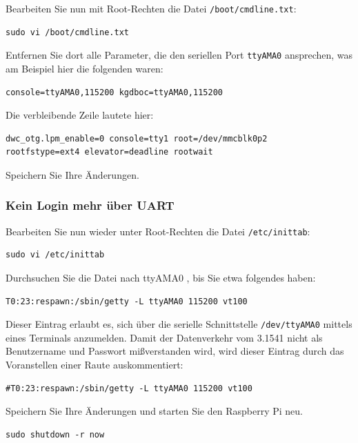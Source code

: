 \documentclass[10pt,a4paper]{scrartcl}		%
\begin{document}
Bearbeiten Sie nun mit Root-Rechten die Datei \texttt{/boot/cmdline.txt}:

\begin{verbatim}
sudo vi /boot/cmdline.txt
\end{verbatim}

Entfernen Sie dort alle Parameter, die den seriellen Port \texttt{ttyAMA0}
ansprechen, was am Beispiel hier die folgenden waren:

\begin{verbatim}
console=ttyAMA0,115200 kgdboc=ttyAMA0,115200
\end{verbatim}

Die verbleibende Zeile lautete hier:
\begin{verbatim}
dwc_otg.lpm_enable=0 console=tty1 root=/dev/mmcblk0p2 
rootfstype=ext4 elevator=deadline rootwait
\end{verbatim}

Speichern Sie Ihre Änderungen.

\subsubsection*{Kein Login mehr über UART}
Bearbeiten Sie nun wieder unter
Root-Rechten die Datei \texttt{/etc/inittab}:

\begin{verbatim}
sudo vi /etc/inittab
\end{verbatim}

Durchsuchen Sie die Datei nach \glqq{}ttyAMA0 \grqq{}, bis Sie 
etwa folgendes haben:

\begin{verbatim}
T0:23:respawn:/sbin/getty -L ttyAMA0 115200 vt100
\end{verbatim}

Dieser Eintrag erlaubt es, sich über die serielle Schnittstelle
\texttt{/dev/ttyAMA0} mittels eines Terminals anzumelden.
Damit der Datenverkehr vom 3.1541 nicht als Benutzername und Passwort
mißverstanden wird, wird dieser Eintrag durch das Voranstellen einer Raute 
auskommentiert:

\begin{verbatim}
#T0:23:respawn:/sbin/getty -L ttyAMA0 115200 vt100
\end{verbatim}

Speichern Sie Ihre Änderungen und starten Sie den Raspberry Pi neu.

\begin{verbatim}
sudo shutdown -r now
\end{verbatim}
\end{document}
